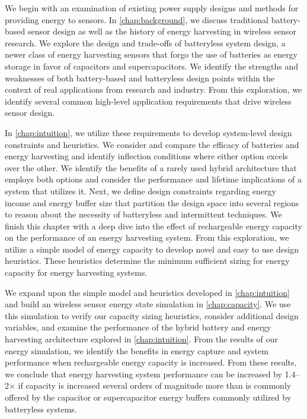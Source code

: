 We begin with an examination of existing power supply designs and methods for providing energy to sensors. In \cref{chap:background}, we discuss traditional battery-based sensor design as well as the history of energy harvesting in wireless sensor research.
We explore the design and trade-offs of batteryless system design, a newer class of energy harvesting sensors that forgo the use of batteries as energy storage in favor of capacitors and supercapacitors.
We identify the strengths and weaknesses of both battery-based and batteryless design points within the context of real applications from research and industry. 
From this exploration, we identify several common high-level application requirements that drive wireless sensor design.

In \cref{chap:intuition}, we utilize these requirements to develop system-level design constraints and heuristics.
We consider and compare the efficacy of batteries and energy harvesting and identify inflection conditions where either option excels over the other. We identify the benefits of a rarely used hybrid architecture that employs both options and consider the performance and lifetime implications of a system that utilizes it.
Next, we define design constraints regarding energy income and energy buffer size that partition the design space into several regions to reason about the necessity of batteryless and intermittent techniques. 
We finish this chapter with a deep dive into the effect of rechargeable energy capacity on the performance of an energy harvesting system. From this exploration, we utilize a simple model of energy capacity to develop novel and easy to use design heuristics. These heuristics determine the minimum sufficient sizing for energy capacity for energy harvesting systems. 

We expand upon the simple model and heuristics developed in \cref{chap:intuition} and build an wireless sensor energy state simulation in \cref{chap:capacity}.
We use this simulation to verify our capacity sizing heuristics, consider additional design variables, and examine the performance of the hybrid battery and energy harvesting architecture explored in \cref{chap:intuition}.
From the results of our energy simulation, we identify the benefits in energy capture and system performance when rechargeable energy capacity is increased. From these results, we conclude that energy harvesting system performance can be increased by 1.4--2$\times$ if capacity is increased several orders of magnitude more than is commonly offered by the capacitor or supercapacitor energy buffers commonly utilized by batteryless systems. 

